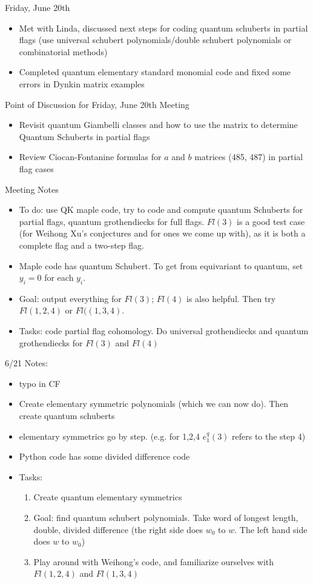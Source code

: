 Friday, June 20th
\begin{itemize}
    \item Met with Linda, discussed next steps for coding quantum schuberts in partial flags (use universal schubert polynomials/double schubert polynomials or combinatorial methods)
    \item Completed quantum elementary standard monomial code and fixed some errors in Dynkin matrix examples
\end{itemize}


Point of Discussion for Friday, June 20th Meeting
\begin{itemize}
    \item Revisit quantum Giambelli classes and how to use the matrix to determine Quantum Schuberts in partial flags
    \item Review Ciocan-Fontanine formulas for $a$ and $b$ matrices (485, 487) in partial flag cases
\end{itemize}


Meeting Notes
\begin{itemize}
    \item To do: use QK maple code, try to code and compute quantum Schuberts for partial flags, quantum grothendiecks for full flags. $Fl(3)$ is a good test case (for Weihong Xu's conjectures and for ones we come up with), as it is both a complete flag and a two-step flag. 
    \item Maple code has quantum Schubert. To get from equivariant to quantum, set $y_i = 0$ for each $y_i$.
    \item Goal: output everything for $Fl(3)$; $Fl(4)$ is also helpful. Then try $Fl(1,2,4)$ or $Fl((1,3,4)$.
    \item Tasks: code partial flag cohomology. Do universal grothendiecks and quantum grothendiecks for $Fl(3)$ and $Fl(4)$
\end{itemize}

6/21 Notes:
\begin{itemize}
    \item typo in CF
    \item Create elementary symmetric polynomials (which we can now do). Then create quantum schuberts
    \item elementary symmetrics go by step. (e.g. for 1,2,4 $e_1^q(3)$ refers to the step 4)
    \item Python code has some divided difference code
    \item Tasks:
    \begin{enumerate}
        \item Create quantum elementary symmetrics
        \item Goal: find quantum schubert polynomials. Take word of longest length, double, divided difference (the right side does $w_0$ to $w$. The left hand side does $w$ to $w_0$) 
        \item Play around with Weihong's code, and familiarize ourselves with $Fl(1,2,4)$ and $Fl(1,3,4)$
    \end{enumerate}
\end{itemize}
